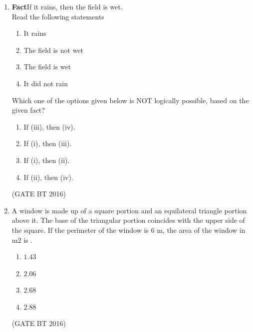\documentclass[journal,12pt,onecolumn]{IEEEtran}
\theoremstyle{remark}
\begin{document}
\begin{enumerate}
\item \textbf{Fact}\:If it rains, then the field is wet.\\
Read the following statements\:
  \begin{enumerate}[label=\roman*.]
\item It rains
\item The field is not wet
\item The field is wet
\item It did not rain
 \end{enumerate}
Which one of the options given below is NOT logically possible, based on the given fact?
   \begin{multicols}{2}
    \begin{enumerate}
\item  If (iii), then (iv).	
\item If (i), then (iii).
\item If (i), then (ii).	
\item If (ii), then (iv).
     \end{enumerate}
     \end{multicols} \hfill(GATE BT 2016)  

\item A window is made up of a square portion and an equilateral triangle portion above it. The base of the triangular portion coincides with the upper side of the square. If the perimeter of the window is $6$ m, the area of the window in m$2$ is 	.
 \begin{multicols}{2}
    \begin{enumerate}
\item $1.43$
\item $2.06$
\item $2.68$	
\item $2.88$
 \end{enumerate}
     \end{multicols} \hfill(GATE BT 2016)   



\end{enumerate}
\end{document}
